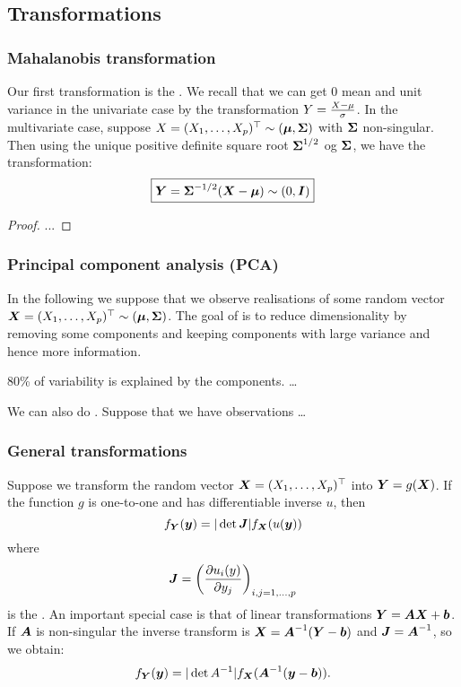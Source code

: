 \subsection{Transformations}
\subsubsection{Mahalanobis transformation}

Our first transformation is the . We recall that we can get 0 mean and unit variance in the univariate case by the transformation $Y=\frac{X-\mu}{\sigma}$. In the multivariate case, suppose $X=(X_1,\dots, X_p)^\top\sim (\boldsymbol{\mu}, \boldsymbol{\Sigma})$ with $\boldsymbol{\Sigma}$ non-singular. Then using the unique positive definite square root $\boldsymbol{\Sigma}^{1/2}$ og $\boldsymbol{\Sigma}$, we have the transformation:
\begin{equation}
    \boxed{\boldsymbol{Y}=\boldsymbol{\Sigma}^{-1/2}(\boldsymbol{X}-\boldsymbol{\mu}) \sim (0, \boldsymbol{I})}
\end{equation}
\begin{proof}
    ...
\end{proof}

\subsubsection{Principal component analysis (PCA)}
In the following we suppose that we observe realisations of some random vector $\boldsymbol{X}=(X_1,\dots,X_p)^\top \sim (\boldsymbol{\mu}, \boldsymbol{\Sigma})$. The goal of  is to reduce dimensionality by removing some components and keeping components with large variance and hence more information. 


80\% of variability is explained by the components. \dots

\TODO{}


We can also do . Suppose that we have observations \dots

\TODO{}


\subsubsection{General transformations}

Suppose we transform the random vector $\boldsymbol{X}=(X_1,\dots,X_p)^\top$ into $\boldsymbol{Y}=g(\boldsymbol{X})$. If the function $g$ is one-to-one and has differentiable inverse $u$, then 
\begin{equation*}
    f_{\boldsymbol{Y}}(\boldsymbol{y}) = |\det{\boldsymbol{J}}| f_{\boldsymbol{X}} (u(\boldsymbol{y}))
\end{equation*}
where 
$$
    \boldsymbol{J} = \left( \frac{\partial u_i (y)}{\partial y_j} \right)_{i,j=1,\dots,p}
$$
is the . An important special case is that of linear transformations $\boldsymbol{Y} = \boldsymbol{A}\boldsymbol{X} + \boldsymbol{b}$. If $\boldsymbol{A}$ is non-singular the inverse transform is $\boldsymbol{X} = \boldsymbol{A}^{-1}(\boldsymbol{Y}-\boldsymbol{b})$ and $\boldsymbol{J} = \boldsymbol{A}^{-1}$, so we obtain:
\begin{equation*}
    f_{\boldsymbol{Y}}(\boldsymbol{y}) = |\det{A^{-1}}| f_{\boldsymbol{X}} (\boldsymbol{A}^{-1}(\boldsymbol{y}-\boldsymbol{b})).
\end{equation*}

